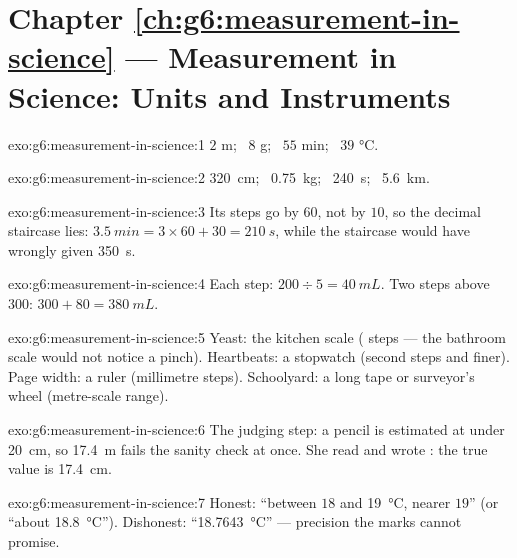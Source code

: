 \section*{Chapter \ref{ch:g6:measurement-in-science} --- Measurement in Science: Units and Instruments}

\begin{solution}{exo:g6:measurement-in-science:1}
$2$ \unit{m}; \ $8$ \unit{g}; \ $55$ \unit{min}; \ $39$
\unit{\celsius}.
\end{solution}

\begin{solution}{exo:g6:measurement-in-science:2}
\qty{320}{cm}; \ \qty{0.75}{kg}; \ \qty{240}{s}; \ \qty{5.6}{km}.
\end{solution}

\begin{solution}{exo:g6:measurement-in-science:3}
Its steps go by $60$, not by $10$, so the decimal staircase lies:
$\qty{3.5}{min} = 3 \times 60 + 30 = \qty{210}{s}$, while the
staircase would have wrongly given \qty{350}{s}.
\end{solution}

\begin{solution}{exo:g6:measurement-in-science:4}
Each step: $200 \div 5 = \qty{40}{mL}$. Two steps above $300$:
$300 + 80 = \qty{380}{mL}$.
\end{solution}

\begin{solution}{exo:g6:measurement-in-science:5}
Yeast: the kitchen scale ( steps --- the bathroom scale would
not notice a pinch). Heartbeats: a stopwatch (second steps and
finer). Page width: a ruler (millimetre steps). Schoolyard: a long
tape  or surveyor's wheel (metre-scale range).
\end{solution}

\begin{solution}{exo:g6:measurement-in-science:6}
The judging step: a pencil is estimated at under \qty{20}{cm}, so
\qty{17.4}{m} fails the sanity check at once. She read 
and wrote : the true value is \qty{17.4}{cm}.
\end{solution}

\begin{solution}{exo:g6:measurement-in-science:7}
Honest: ``between $18$ and \qty{19}{\celsius}, nearer $19$'' (or
``about \qty{18.8}{\celsius}''). Dishonest: ``\qty{18.7643}
{\celsius}'' --- precision the marks cannot promise.
\end{solution}

